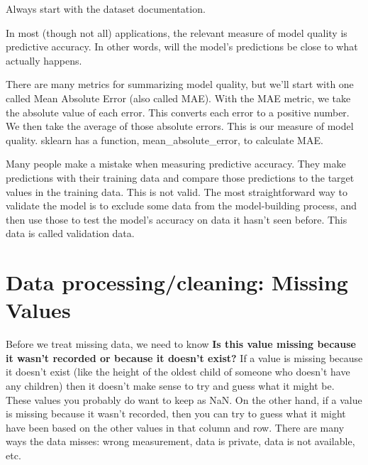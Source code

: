 \documentclass[12pt]{report}
\begin{document}
Always start with the dataset documentation.

In most (though not all) applications, the relevant measure of model quality is predictive accuracy. In other words, will the model's predictions be close to what actually happens.

There are many metrics for summarizing model quality, but we'll start with one called Mean Absolute Error (also called MAE). With the MAE metric, we take the absolute value of each error. This converts each error to a positive number. We then take the average of those absolute errors. This is our measure of model quality. sklearn has a function, mean\_absolute\_error, to calculate MAE.


Many people make a mistake when measuring predictive accuracy. They make predictions with their training data and compare those predictions to the target values in the training data. This is not valid. The most straightforward way to validate the model is to exclude some data from the model-building process, and then use those to test the model's accuracy on data it hasn't seen before. This data is called validation data.

\section{Data processing/cleaning: Missing Values}
\label{sec:missing}

Before we treat missing data, we need to know \textbf{Is this value missing because it wasn't recorded or because it doesn't exist?} If a value is missing because it doesn't exist (like the height of the oldest child of someone who doesn't have any children) then it doesn't make sense to try and guess what it might be. These values you probably do want to keep as NaN. On the other hand, if a value is missing because it wasn't recorded, then you can try to guess what it might have been based on the other values in that column and row.  There are many ways the data misses: wrong measurement, data is private, data is not available, etc.
\end{document}
